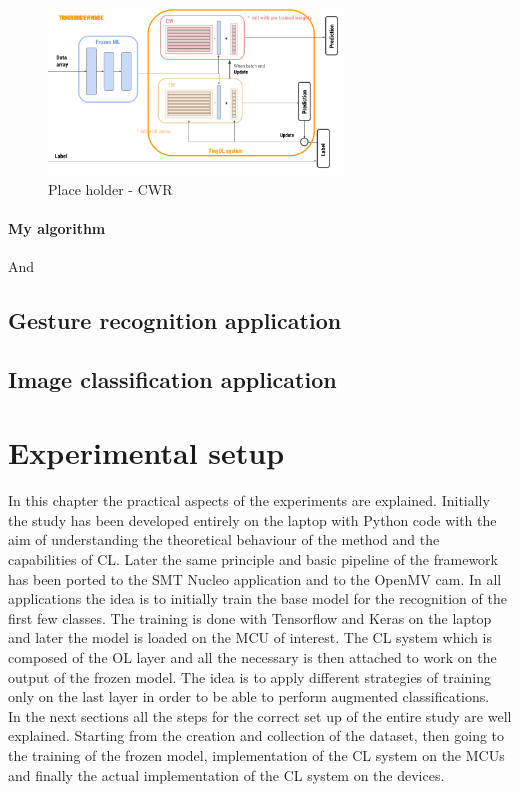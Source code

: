 \documentclass[12pt]{report}
\begin{document}
%
\begin{figure}[h!]
    \centering
    \includegraphics[width=0.7\textwidth]{Figures/Chapter3/CWR.png} 
    \caption{Place holder - CWR}
    \label{fig:block_diag_CWR}    
\end{figure}
%
\subsubsection{My algorithm}





And


\section{Gesture recognition application}

\section{Image classification application}





\chapter{Experimental setup}

In this chapter the practical aspects of the experiments are explained. Initially the study has been developed entirely on the laptop with Python code with the aim of understanding the theoretical behaviour of the method and the capabilities of CL. Later the same principle and basic pipeline of the framework has been ported to the SMT Nucleo application and to the OpenMV cam. In all applications the idea is to initially train the base model for the recognition of the first few classes. The training is done with Tensorflow and Keras on the laptop and later the model is loaded on the MCU of interest. The CL system which is composed of the OL layer and all the necessary is then attached to work on the output of the frozen model. The idea is to apply different strategies of training only on the last layer in order to be able to perform augmented classifications.  \\
In the next sections all the steps for the correct set up of the entire study are well explained. Starting from the creation and collection of the dataset, then going to the training of the frozen model, implementation of the CL system on the MCUs and finally the actual implementation of the CL system on the devices. 
\end{document}
